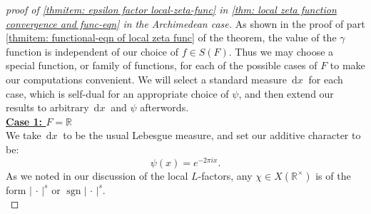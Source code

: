 \documentclass[11pt, x11names, openany]{book}
\newcommand{\rr}{\mathbb{R}}
\newcommand{\abs}[1]{\left| \, #1  \,\right|}
\DeclareMathOperator{\sgn}{sgn}
\newcommand{\dx}{\, \mathrm{d}x \ }
\begin{document}
\begin{proof}[proof of \ref{thmitem: epsilon factor local-zeta-func} in \ref{thm: local zeta function convergence and func-eqn} in the Archimedean case]
As shown in the proof of part \ref{thmitem: functional-eqn of local zeta func} of the theorem, the value of the $\gamma$ function is independent of our choice of $f \in S(F)$. Thus we may choose a special function, or family of functions, for each of the possible cases of $F$ to make our computations convenient. We will select a standard measure $\dx$ for each case, which is self-dual for an appropriate choice of $\psi$, and then extend our results to arbitrary $\dx$ and $\psi$ afterwords.\\

\textbf{\underline{Case 1: $F = \rr$}}\\
We take $\dx$ to be the usual Lebesgue measure, and set our additive character to be:
\begin{equation*}
    \psi(x) = e^{- 2 \pi i x}.
\end{equation*}
As we noted in our discussion of the local $L$-factors, any $\chi \in X(\rr^\times)$ is of the form $\abs{\cdot}^s$ or $\sgn \abs{\cdot}^s$.\\


\end{proof}
\end{document}
